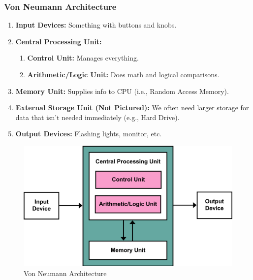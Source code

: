 \documentclass{beamer}
\begin{document}
%
%
\begin{frame}
  \frametitle{Von Neumann Architecture}
  \begin{minipage}{0.59\textwidth}
    \begin{enumerate}
      \item \textbf{Input Devices: } Something with buttons and knobs.
      \item \textbf{Central Processing Unit:}
        \begin{enumerate}
          \item \textbf{Control Unit: } Manages everything.
          \item \textbf{Arithmetic/Logic Unit: } Does math and logical comparisons.
        \end{enumerate}
      \item \textbf{Memory Unit: } Supplies info to CPU (i.e., Random Access Memory).
      \item \textbf{External Storage Unit (Not Pictured): } We often need larger storage for data that isn't needed immediately (e.g., Hard Drive).
      \item \textbf{Output Devices: } Flashing lights, monitor, etc.
    \end{enumerate}
  \end{minipage}
  \begin{minipage}{0.39\textwidth}
    \begin{figure}
      \includegraphics[width=\textwidth]{imgs/von-neumann-arch.png}
      \caption{Von Neumann Architecture}
      \label{fig:vonneumannarch}
    \end{figure}
  \end{minipage}
\end{frame}
\end{document}
